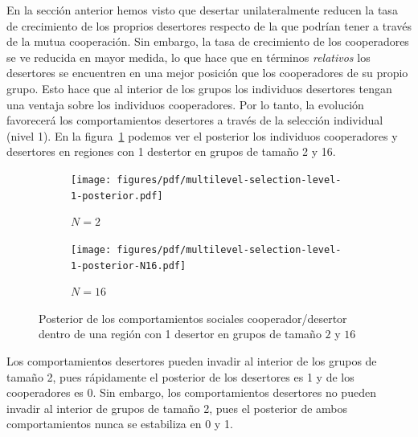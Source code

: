\documentclass[a4paper,10pt]{article}
\begin{document}
En la sección anterior hemos visto que desertar unilateralmente reducen la tasa de crecimiento de los proprios desertores respecto de la que podrían tener a través de la mutua cooperación.
%
Sin embargo, la tasa de crecimiento de los cooperadores se ve reducida en mayor medida, lo que hace que en términos \emph{relativos} los desertores se encuentren en una mejor posición que los cooperadores de su propio grupo.
%
Esto hace que al interior de los grupos los individuos desertores tengan una ventaja sobre los individuos cooperadores.
%
Por lo tanto, la evolución favorecerá los comportamientos desertores a través de la selección individual (nivel 1).
%
En la figura~\ref{fig:multilevel-selection-level-1-posterior} podemos ver el posterior los individuos cooperadores y desertores en regiones con 1 destertor en grupos de tamaño 2 y 16.
%
\begin{figure}[H]
    \centering
    \begin{subfigure}[b]{0.48\textwidth}
    \texttt{[image: figures/pdf/multilevel-selection-level-1-posterior.pdf]}
    \caption{$N=2$}
    \end{subfigure}
    \begin{subfigure}[b]{0.48\textwidth}
    \texttt{[image: figures/pdf/multilevel-selection-level-1-posterior-N16.pdf]}
    \caption{$N=16$}
    \end{subfigure}
    \caption{
    Posterior de los comportamientos sociales cooperador/desertor dentro de una región con 1 desertor en grupos de tamaño $2$ y $16$
    }
    \label{fig:multilevel-selection-level-1-posterior}
\end{figure}
%
Los comportamientos desertores pueden invadir al interior de los grupos de tamaño 2, pues rápidamente el posterior de los desertores es 1 y de los cooperadores es 0.
%
Sin embargo, los comportamientos desertores no pueden invadir al interior de grupos de tamaño 2, pues el posterior de ambos comportamientos nunca se estabiliza en 0 y 1.

\end{document}
